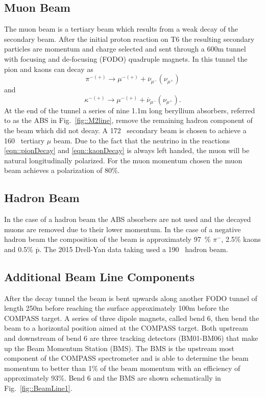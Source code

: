 \subsection{Muon Beam}
The muon beam is a tertiary beam which results from a weak decay of the
secondary beam.  After the initial proton reaction on T6 the resulting secondary
particles are momentum and charge selected and sent through a 600m tunnel with
focusing and de-focusing (FODO) quadruple magnets.  In this tunnel the pion and
kaons can decay as
\begin{equation}
  \pi^{-(+)} \rightarrow \mu^{-(+)} + \overline{\nu}_{\mu^-}(\nu_{\mu^+})
  \label{eqn::pionDecay}
\end{equation}
\noindent
and
\begin{equation}
  \kappa^{-(+)} \rightarrow \mu^{-(+)} + \overline{\nu}_{\mu^-}(\nu_{\mu^+}).
  \label{eqn::kaonDecay}
\end{equation}
\noindent
At the end of the tunnel a series of nine 1.1m long beryllium absorbers,
referred to as the ABS in Fig.~\ref{fig::M2line}, remove the remaining hadron
component of the beam which did not decay.  A 172~{\gvc} secondary beam is
chosen to achieve a 160~{\gvc} tertiary $\mu$ beam.  Due to the fact that the
neutrino in the reactions \ref{eqn::pionDecay} and \ref{eqn::kaonDecay} is
always left handed, the muon will be natural longitudinally polarized.  For the
muon momentum chosen the muon beam achieves a polarization of 80\%.

\subsection{Hadron Beam}
In the case of a hadron beam the ABS absorbers are not used and the decayed
muons are removed due to their lower momentum.  In the case of a negative hadron
beam the composition of the beam is approximately 97~\% $\pi^-$, 2.5\% kaons and
0.5\% $\overline{\mathrm{p}}$. The 2015 Drell-Yan data taking used a 190~{\gvc}
hadron beam. \par

\subsection{Additional Beam Line Components} \label{sec::addBeam}
After the decay tunnel the beam is bent upwards along another FODO tunnel of
length 250m before reaching the surface approximately 100m before the COMPASS
target.  A series of three dipole magnets, called bend 6, then bend the beam to
a horizontal position aimed at the COMPASS target.  Both upstream and downstream
of bend 6 are three tracking detectors (BM01-BM06) that make up the Beam
Momentum Station (BMS).  The BMS is the upstream most component of the COMPASS
spectrometer and is able to determine the beam momentum to better than 1\% of
the beam momentum with an efficiency of approximately 93\%.  Bend 6 and the BMS
are shown schematically in Fig.~\ref{fig::BeamLine1}. \par

